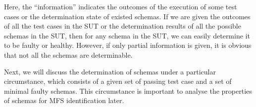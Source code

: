 Here, the ``information'' indicates the outcomes of the execution of some test cases or the determination state of existed schemas. If we are given the outcomes of all the test cases in the SUT or the determination results of all the possible schemas in the SUT, then for any schema in the SUT, we can easily determine it to be faulty or healthy. However, if only partial information is given, it is obvious that not all the schemas are determinable.

Next, we will discuss the determination of schemas under a particular circumstance, which consists of a given set of passing test case and a set of minimal faulty schemas. This circumstance is important to analyse the properties of schemas for MFS identification later.

%
%
%
%
%
%

